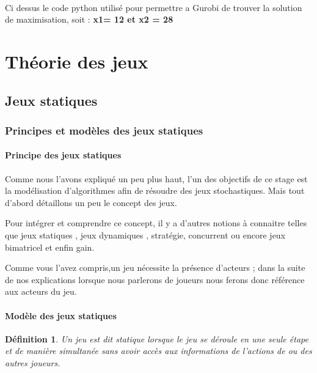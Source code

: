 \documentclass[a4paper, 12pt, twoside]{article}
\newtheorem{definition}{Définition}
\begin{document}
\paragraph*{}{Ci dessus le code python utilisé pour permettre a \textsf{Gurobi} de trouver la solution de maximisation, soit  : \textbf{x1= 12 et x2 = 28}}
\newpage







\section{Théorie des jeux}

\subsection{Jeux statiques}
\subsubsection{Principes et modèles des jeux statiques }
\paragraph{Principe des jeux statiques}
Comme nous l'avons expliqué un peu plus haut, l'un des objectifs de ce stage est la modélisation d'algorithmes afin de résoudre des jeux stochastiques. Mais tout d'abord détaillons un peu le concept des \textsf{jeux}. \newline

Pour intégrer et comprendre ce concept, il y a d'autres notions à connaitre telles que \textsf{jeux statiques} , \textsf{jeux dynamiques} , \textsf{stratégie}, \textsf{concurrent}  ou encore \textsf{jeux bimatricel} et enfin \textsf{gain}.\newline

Comme vous l'avez compris,un jeu nécessite la présence d'acteurs ; dans la suite de nos explications lorsque nous parlerons de \textsf{joueurs} nous ferons donc référence aux acteurs du jeu.

\paragraph{Modèle des jeux statiques}
\begin{definition}
Un jeu est dit statique lorsque le jeu se déroule en une seule étape et de manière simultanée sans avoir accès aux informations de l'actions de ou des autres joueurs.
\end{definition} 
\end{document}
